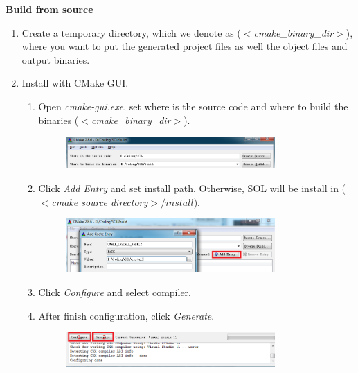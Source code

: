 \documentclass[11pt,a4paper]{article}
\newlength{\wideitemsep}
\let\olditem\item
\renewcommand{\item}{\setlength{\itemsep}{\wideitemsep}\olditem}
\begin{document}
\hspace{-5mm}\textbf{Build from source}
\begin{enumerate}
    \item Create a temporary directory, which we denote as
        ($<$\emph{cmake\_binary\_dir}$>$), where you want to put the generated
        project files as well the object files and output binaries.
    \item Install with CMake GUI.
        \begin{enumerate}
            \item Open \emph{cmake-gui.exe}, set where is the
                source code and where to build the binaries ($<$\emph{cmake\_binary\_dir}$>$).
                \begin{figure}[!h]
                    \centering
                    \includegraphics[width=0.8\textwidth]{figs/gui_path.png}
                    \label{fig:gui_path}
                \end{figure}
            \item Click \emph{Add Entry} and set install path. Otherwise, SOL will
                be install in ($<$\emph{cmake source directory}$>/install$).
                \begin{figure}[!h]
                    \centering
                    \includegraphics[width=0.8\textwidth]{figs/gui_install_path.png}
                    \label{fig:gui_install_path}
                \end{figure}

            \item Click \emph{Configure} and select compiler.
            \item After finish configuration, click \emph{Generate}.
                \begin{figure}[!h]
                    \centering
                    \includegraphics[width=0.8\textwidth]{figs/cmake_configure.png}
                    \label{fig:config}
                \end{figure}


\end{enumerate}
\end{enumerate}
\end{document}
